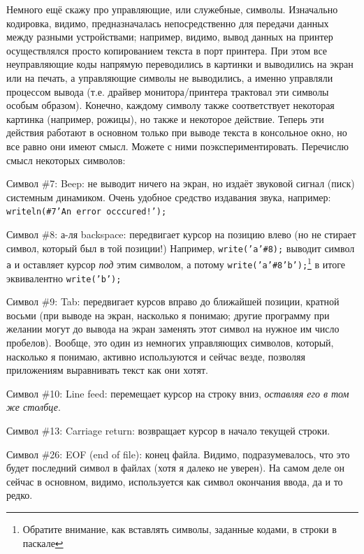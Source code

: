 Немного ещё скажу про управляющие, или служебные, символы. Изначально кодировка, 
видимо, предназначалась непосредственно для передачи данных между разными устройствами; например, видимо, вывод данных на принтер 
осуществлялся просто копированием текста в порт принтера. При этом все неуправляющие коды 
напрямую переводились в картинки и выводились на экран или на печать, а управляющие символы 
не выводились, а именно управляли процессом вывода (т.е. драйвер монитора/принтера 
трактовал эти символы особым образом). Конечно, каждому символу также 
соответствует некоторая картинка (например, рожицы),  
но также и некоторое действие. Теперь эти действия работают в основном только при выводе текста в 
консольное окно, но все равно они имеют смысл. Можете с ними поэкспериментировать. Перечислю смысл некоторых символов:
\begin{ulist}                                                                 
\item Символ \#7: Beep: не выводит ничего на экран, но издаёт звуковой сигнал (писк) системным динамиком.
Очень удобное средство издавания звука, например: \texttt{writeln(\#7'An error occcured!');}
\item Символ \#8: а-ля backspace: передвигает курсор на позицию влево (но не стирает символ, который был 
в той позиции!) Например, \texttt{write('a'\#8);} выводит символ \texttt a и оставляет курсор \textit{под}
этим символом, а потому \texttt{write('a'\#8'b');}\footnote{Обратите внимание, как вставлять символы, заданные кодами, в строки в паскале} в итоге эквивалентно \texttt{write('b');}
\item Символ \#9: Tab: передвигает курсов вправо до ближайшей позиции, кратной восьми (при выводе на экран,
насколько я понимаю; другие программу при желании могут до вывода на экран заменять этот символ на нужное им 
число пробелов). Вообще, это один из немногих управляющих символов, который, насколько я понимаю, активно
используются и сейчас везде, позволяя приложениям выравнивать текст как они хотят.
\item Символ \#10: Line feed: перемещает курсор на строку вниз, \textit{оставляя его в том же столбце}.
\item Символ \#13: Carriage return: возвращает курсор в начало текущей строки.
\item Символ \#26: EOF (end of file): конец файла. Видимо, подразумевалось, что это будет последний символ в файлах
(хотя я далеко не уверен). На самом деле он сейчас в основном, видимо, используется как символ окончания ввода, 
да и то редко.
\end{ulist}

